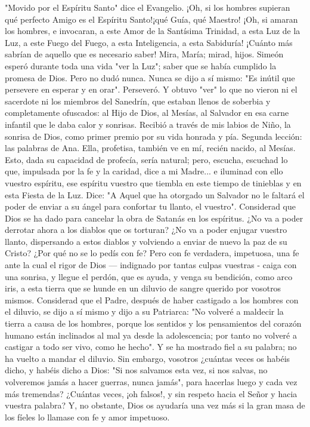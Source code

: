 \documentclass[12pt]{book} %
\begin{document}
"Movido por el Espíritu Santo" dice el Evangelio. ¡Oh, si los hombres supieran qué perfecto Amigo es el Espíritu Santo!¡qué Guía, qué Maestro! ¡Oh, si amaran los hombres, e invocaran, a este Amor de la Santísima Trinidad, a esta Luz de la Luz, a este Fuego del Fuego, a esta Inteligencia, a esta Sabiduría! ¡Cuánto más sabrían de aquello que es necesario saber! 
Mira, María; mirad, hijos. Simeón esperó durante toda una vida "ver la Luz"; saber que se había cumplido la promesa de Dios. Pero no dudó nunca. Nunca se dijo a sí mismo: "Es inútil que persevere en esperar y en orar". Perseveró. Y obtuvo "ver" lo que no vieron ni el sacerdote ni los miembros del Sanedrín, que estaban llenos de soberbia y completamente ofuscados: al Hijo de Dios, al Mesías, al Salvador en esa carne infantil que le daba calor y sonrisas. Recibió a través de mis labios de Niño, la sonrisa de Dios, como primer premio por su vida honrada y pía.             
Segunda lección: las palabras de Ana. Ella, profetisa, también ve en mí, recién nacido, al Mesías. Esto, dada su 
capacidad de profecía, sería natural; pero, escucha, escuchad lo que, impulsada por la fe y la caridad, dice a mi Madre... e iluminad con ello vuestro espíritu, ese espíritu vuestro que tiembla en este tiempo de tinieblas y en esta Fiesta de la Luz. Dice: "A 
Aquel que ha otorgado un Salvador no le faltará el poder de enviar a su ángel para confortar tu llanto, el vuestro".                      
Considerad que Dios se ha dado para cancelar la obra de Satanás en los espíritus. ¿No va a poder derrotar ahora a los 
diablos que os torturan? ¿No va a poder enjugar vuestro llanto, dispersando a estos diablos y volviendo a enviar de nuevo la paz de su Cristo? ¿Por qué no se lo pedís con fe? Pero con fe verdadera, impetuosa, una fe ante la cual el rigor de Dios — indignado por tantas culpas vuestras - caiga con una sonrisa, y llegue el perdón, que es ayuda, y venga su bendición, como arco iris, a esta tierra que se hunde en un diluvio de sangre querido por vosotros mismos. 
Considerad que el Padre, después de haber castigado a los hombres con el diluvio, se dijo a sí mismo y dijo a su Patriarca: "No volveré a maldecir la tierra a causa de los hombres, porque los sentidos y los pensamientos del corazón humano están inclinados al mal ya desde la adolescencia; por tanto no volveré a castigar a todo ser vivo, como he hecho". Y se ha mostrado fiel a su palabra; no ha vuelto a mandar el diluvio. Sin embargo, vosotros ¿cuántas veces os habéis dicho, y habéis dicho a Dios: "Si nos salvamos esta vez, si nos salvas, no volveremos jamás a hacer guerras, nunca jamás", para hacerlas luego y cada vez más tremendas? ¿Cuántas veces, ¡oh falsos!, y sin respeto hacia el Señor y hacia vuestra palabra? Y, no obstante, Dios os ayudaría una vez más si la gran masa de los fíeles lo llamase con fe y amor impetuoso. 
\end{document}
